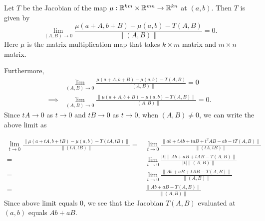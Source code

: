
\begin{solution}
    Let $T$ be the Jacobian of the map
    $\mu:\mathbb{R}^{km}\times\mathbb{R}^{mn}\to\mathbb{R}^{kn}$ at
    $(a,b)$. Then $T$
    is given by
    $$\lim_{(A,B)\to 0}
    {\frac{\mu(a+A,b+B)-\mu(a,b)-T(A,B)}{\|(A,B)\|}}=0.$$
    Here $\mu$ is the matrix multiplication map that
    takes $k\times m$ matrix and $m\times n$ matrix.

    Furthermore,
    \begin{align*}
        &\lim_{(A,B)\to 0}
        {\frac{\mu(a+A,b+B)-\mu(a,b)-T(A,B)}
        {\|(A,B)\|}}=0
        \\
        \implies &\lim_{(A,B)\to 0}
        {\frac{\|\mu(a+A,b+B)-\mu(a,b)-T(A,B)\|}
        {\|(A,B)\|}}=0.
    \end{align*}
    Since $tA\to 0$ as $t\to 0$ and $tB\to 0$ as $t\to 0$,
    when $(A,B)\neq 0$, we can write the
    above limit as

    \begin{align*}
        \lim_{t\to 0}
        {\frac{\|\mu(a+tA,b+tB)-\mu(a,b)-T(tA,tB)\|}
        {\|(tA,tB)\|}}
        =&\lim_{t\to 0}
        {\frac{\|ab+tAb+taB+t^2AB-ab-tT(A,B)\|}
        {\|(tA,tB)\|}}\\
        =&\lim_{t\to 0}
        {\frac{|t|\|Ab+aB+tAB-T(A,B)\|}
        {|t|\|(A,B)\|}}\\
        =&\lim_{t\to 0}
        {\frac{\|Ab+aB+tAB-T(A,B)\|}
        {\|(A,B)\|}}\\
        =&\frac{\|Ab+aB-T(A,B)\|}
        {\|(A,B)\|}
    \end{align*}
    Since above limit equals 0, we see that
    the Jacobian
    $T(A,B)$ evaluated at $(a,b)$ equals $Ab+aB$.

\end{solution}